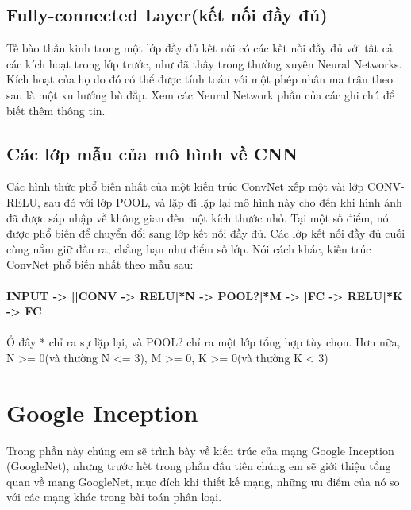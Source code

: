 \documentclass[a4paper,12pt]{report}
\begin{document}
\section{Fully-connected Layer(kết nối đầy đủ)}
Tế bào thần kinh trong một lớp đầy đủ kết nối có các kết nối đầy đủ với tất cả các kích hoạt trong lớp trước, như đã thấy trong thường xuyên Neural Networks. Kích hoạt của họ do đó có thể được tính toán với một phép nhân ma trận theo sau là một xu hướng bù đắp. Xem các Neural Network phần của các ghi chú để biết thêm thông tin.
\section{Các lớp mẫu của mô hình về CNN}
Các hình thức phổ biến nhất của một kiến trúc ConvNet xếp một vài lớp CONV-RELU, sau đó với lớp POOL, và lặp đi lặp lại mô hình này cho đến khi hình ảnh đã được sáp nhập về không gian đến một kích thước nhỏ. Tại một số điểm, nó được phổ biến để chuyển đổi sang lớp kết nối đầy đủ. Các lớp kết nối đầy đủ cuối cùng nắm giữ đầu ra, chẳng hạn như điểm số lớp. Nói cách khác, kiến trúc ConvNet phổ biến nhất theo mẫu sau: \\
\\
\small{
\textbf{INPUT -> [[CONV -> RELU]*N -> POOL?]*M -> [FC -> RELU]*K -> FC}
}
\\ \\
Ở đây * chỉ ra sự lặp lại, và POOL? chỉ ra một lớp tổng hợp tùy chọn. Hơn nữa, N >= 0(và thường N <= 3), M >= 0, K >= 0(và thường K < 3)


\chapter{Google Inception}
Trong phần này chúng em sẽ trình bày về kiến trúc của mạng Google Inception (GoogleNet), nhưng trước hết trong phần đầu tiên chúng em sẽ giới thiệu tổng quan về mạng GoogleNet, mục đích khi thiết kế mạng, những ưu điểm của nó so với các mạng khác trong bài toán phân loại.
\end{document}

